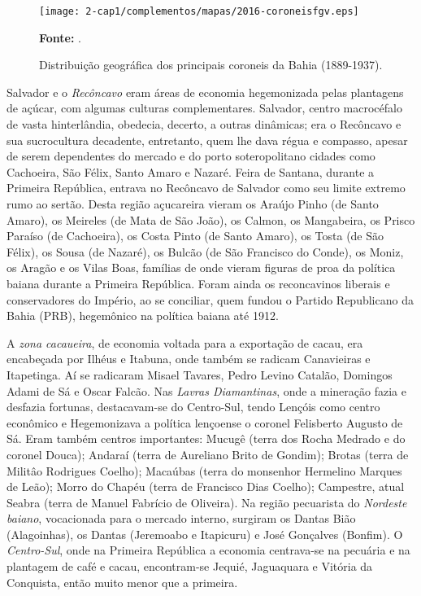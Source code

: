 \begin{figure}[!htp]
\centering
\texttt{[image: 2-cap1/complementos/mapas/2016-coroneisfgv.eps]}{\footnotesize \par \textbf{Fonte:} .}
\caption{Distribuição geográfica dos principais coroneis da Bahia (1889-1937).}\label{2016-coroneisfgv}
\end{figure}

Salvador e o \textit{Recôncavo} eram áreas de economia hegemonizada pelas plantagens de açúcar, com algumas culturas complementares. Salvador, centro macrocéfalo de vasta hinterlândia, obedecia, decerto, a outras dinâmicas; era o Recôncavo e sua sucrocultura decadente, entretanto, quem lhe dava régua e compasso, apesar de serem dependentes do mercado e do porto soteropolitano cidades como Cachoeira, São Félix, Santo Amaro e Nazaré. Feira de Santana, durante a Primeira República, entrava no Recôncavo de Salvador como seu limite extremo rumo ao sertão. Desta região açucareira vieram os Araújo Pinho (de Santo Amaro), os Meireles (de Mata de São João), os Calmon, os Mangabeira, os Prisco Paraíso (de Cachoeira), os Costa Pinto (de Santo Amaro), os Tosta (de São Félix), os Sousa (de Nazaré), os Bulcão (de São Francisco do Conde), os Moniz, os Aragão e os Vilas Boas, famílias de onde vieram figuras de proa da política baiana durante a Primeira República. Foram ainda os reconcavinos liberais e conservadores do Império, ao se conciliar, quem fundou o Partido Republicano da Bahia (PRB), hegemônico na política baiana até 1912.

A \textit{zona cacaueira}, de economia voltada para a exportação de cacau, era encabeçada por Ilhéus e Itabuna, onde também se radicam Canavieiras e Itapetinga. Aí se radicaram Misael Tavares, Pedro Levino Catalão, Domingos Adami de Sá e Oscar Falcão. Nas \textit{Lavras Diamantinas}, onde a mineração fazia e desfazia fortunas, destacavam-se do Centro-Sul, tendo Lençóis como centro econômico e Hegemonizava a política lençoense o coronel Felisberto Augusto de Sá. Eram também centros importantes: Mucugê (terra dos Rocha Medrado e do coronel Douca); Andaraí (terra de Aureliano Brito de Gondim); Brotas (terra de Militâo Rodrigues Coelho); Macaúbas (terra do monsenhor Hermelino Marques de Leão); Morro do Chapéu (terra de Francisco Dias Coelho); Campestre, atual Seabra (terra de Manuel Fabrício de Oliveira). Na região pecuarista do \textit{Nordeste baiano}, vocacionada para o mercado interno,  surgiram os Dantas Bião (Alagoinhas), os Dantas (Jeremoabo e Itapicuru) e José Gonçalves (Bonfim). O \textit{Centro-Sul}, onde na Primeira República a economia centrava-se na pecuária e na plantagem de café e cacau, encontram-se Jequié, Jaguaquara e Vitória da Conquista, então muito menor que a primeira. 

